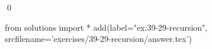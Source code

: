 
\begin{ex}
  \label{ex:39-29-recursion}
  
  \qed
\end{ex}
\begin{python0}
from solutions import *
add(label="ex:39-29-recursion",
    srcfilename='exercises/39-29-recursion/answer.tex')
\end{python0}
